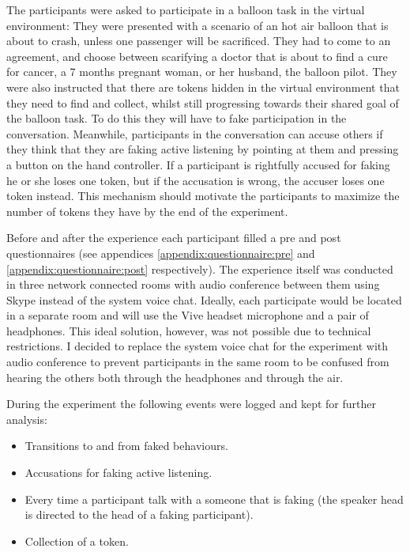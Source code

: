 \documentclass[]{simple-thesis}
\begin{document}
The participants were asked to participate in a balloon task \citep{Howes2012} in the virtual environment:
They were presented with a scenario of an hot air balloon that is about to crash, unless one passenger will be sacrificed.
They had to come to an agreement, and choose between scarifying a doctor that is about to find a cure for cancer, a 7 months pregnant woman, or her husband, the balloon pilot.
They were also instructed that there are tokens hidden in the virtual environment that they need to find and collect, whilst still progressing towards their shared goal of the balloon task.
To do this they will have to fake participation in the conversation.
Meanwhile, participants in the conversation can accuse others if they think that they are faking active listening by pointing at them and pressing a button on the hand controller.
If a participant is rightfully accused for faking he or she loses one token, but if the accusation is wrong, the accuser loses one token instead.
This mechanism should motivate the participants to maximize the number of tokens they have by the end of the experiment.

Before and after the experience each participant filled a pre and post questionnaires (see appendices \ref{appendix:questionnaire:pre} and \ref{appendix:questionnaire:post} respectively).
The experience itself was conducted in three network connected rooms with audio conference between them using Skype instead of the system voice chat.
Ideally, each participate would be located in a separate room and will use the Vive headset microphone and a pair of headphones.
This ideal solution, however, was not possible due to technical restrictions.
I decided to replace the system voice chat for the experiment with audio conference to prevent participants in the same room to be confused from hearing the others both through the headphones and through the air.

During the experiment the following events were logged and kept for further analysis:

\begin{itemize}
  \item Transitions to and from faked behaviours.
  \item Accusations for faking active listening.
  \item Every time a participant talk with a someone that is faking (the speaker head is directed to the head of a faking participant).
  \item Collection of a token.
\end{itemize}
\end{document}
